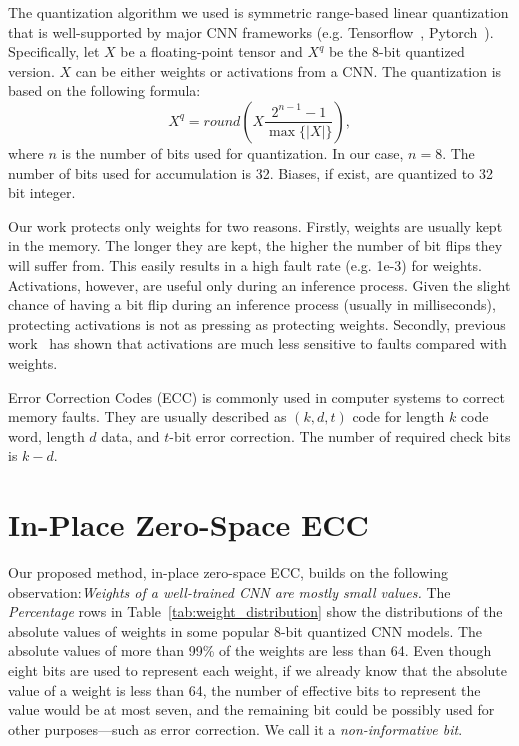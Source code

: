 \documentclass{article}
\newtheorem{observation}{Observation}
\begin{document}
The quantization algorithm we used is symmetric range-based linear quantization that is well-supported by major CNN frameworks (e.g. Tensorflow~\cite{jacob2018quantization}, Pytorch~\cite{neta_zmora_2018_1297430}). Specifically, let $X$ be a floating-point tensor and $X^q$ be the 8-bit quantized version. $X$ can be either weights or activations from a CNN. The quantization is based on the following formula:
\begin{equation}
    X^q = round(X\frac{2^{n-1}-1}{\max\{|X|\}}),
\end{equation}
where $n$ is the number of bits used for quantization. In our case, $n=8$.  The number of bits used for accumulation is 32. Biases, if exist, are quantized to 32 bit integer. 

Our work protects only weights for two reasons. Firstly, weights are usually kept in the memory. The longer they are kept, the higher the number of bit flips they will suffer from. This easily results in a high fault rate (e.g. 1e-3) for weights. Activations, however, are useful only during an inference process. Given the slight chance of having a bit flip during an inference process (usually in milliseconds), protecting activations is not as pressing as protecting weights. Secondly, previous work~\cite{reagen2018ares} has shown that activations are much less sensitive to faults compared with weights.  

Error Correction Codes (ECC) is commonly used in computer systems to correct memory faults. They are usually described as $(k, d, t)$ code for length $k$ code word, length $d$ data, and $t$-bit error correction. The number of required check bits is $k-d$.

\section{In-Place Zero-Space ECC}

Our proposed method, in-place zero-space ECC, builds on the following observation:{\em Weights of a well-trained CNN are mostly small values.} The \textit{Percentage} rows in Table~\ref{tab:weight_distribution} show the distributions of the absolute values of weights in some popular 8-bit quantized CNN models. The absolute values of more than 99\% of the weights are less than 64. Even though eight bits are used to represent each weight, if we already know that the absolute value of a weight is less than 64, the number of effective bits to represent the value would be at most seven, and the remaining bit could be possibly used for other purposes---such as error correction. We call it a {\em non-informative bit}.
\end{document}
